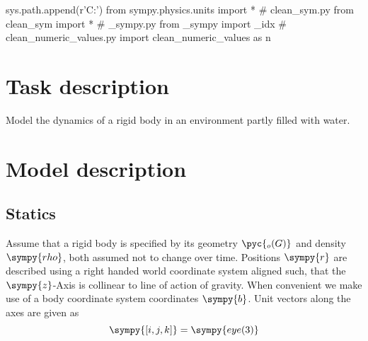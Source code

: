 \documentclass[12pt,a4paper]{article}
\newcommand{\s}{\sympy}
\begin{document}
\tableofcontents

\begin{sympycode}
sys.path.append(r'C:\Users\Murad\evrythg')
from sympy.physics.units import *
# clean_sym.py
from clean_sym import *
# _sympy.py 
from _sympy import _idx
# clean_numeric_values.py
import clean_numeric_values as n
\end{sympycode}



\section{Task description}
Model the dynamics of a rigid body in an environment partly filled with water.
\section{Model description}
\subsection{Statics}
Assume that a rigid body is specified by its geometry $\pyc{_o(G)}$ and density $\s{rho}$, both assumed not to change over time.    Positions $\s{r}$ are described using a right handed world coordinate system aligned such, that the $\s{z}$-Axis is collinear to line of action of gravity.  When convenient we make use of a body coordinate system coordinates $\s{b}$.  Unit vectors along the axes are given as
\begin{equation*}
\s{[i, j, k]} = \s{eye(3)}
\end{equation*}
\end{document}
